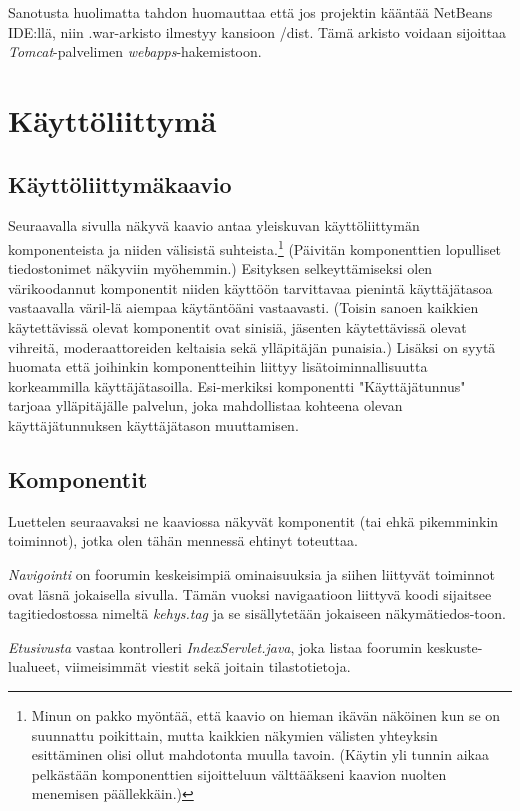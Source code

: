 \documentclass[11pt]{article}
\begin{document}
			Sanotusta huolimatta tahdon huomauttaa että jos projektin 
			kääntää NetBeans IDE:llä, niin .war-arkisto ilmestyy kansioon /dist. Tämä arkisto voidaan
			sijoittaa \emph{Tomcat}-palvelimen \emph{webapps}-hakemistoon.
	
\newpage
\thispagestyle{plain}
	\section{Käyttöliittymä}
		\subsection{Käyttöliittymäkaavio} Seuraavalla sivulla näkyvä kaavio antaa yleiskuvan käyttöliittymän
		komponenteista ja niiden välisistä suhteista.\footnote{Minun on pakko myöntää, että kaavio on hieman
		ikävän näköinen kun se on suunnattu poikittain, mutta kaikkien näkymien välisten yhteyksin esittäminen
		olisi ollut mahdotonta muulla tavoin. (Käytin yli tunnin aikaa pelkästään komponenttien sijoitteluun 
		välttääkseni kaavion nuolten menemisen päällekkäin.)} (Päivitän komponenttien lopulliset tiedostonimet
		näkyviin myöhemmin.) Esityksen selkeyttämiseksi olen värikoodannut komponentit niiden käyttöön
		tarvittavaa pienintä käyttäjätasoa vastaavalla väril-lä aiempaa käytäntöäni vastaavasti. (Toisin sanoen
		kaikkien käytettävissä olevat komponentit ovat sinisiä, jäsenten käytettävissä olevat vihreitä,
		moderaattoreiden keltaisia sekä ylläpitäjän punaisia.) Lisäksi on syytä huomata että joihinkin
		komponentteihin liittyy	lisätoiminnallisuutta korkeammilla käyttäjätasoilla. Esi-merkiksi komponentti
		"Käyttäjätunnus" tarjoaa ylläpitäjälle palvelun, joka mahdollistaa kohteena olevan käyttäjätunnuksen
		käyttäjätason muuttamisen.
		
		\subsection{Komponentit} Luettelen seuraavaksi ne kaaviossa näkyvät komponentit (tai ehkä pikemminkin
		toiminnot), jotka olen tähän mennessä ehtinyt toteuttaa.
		
		\emph{Navigointi} on foorumin keskeisimpiä ominaisuuksia ja siihen liittyvät toiminnot ovat läsnä
		jokaisella sivulla. Tämän vuoksi navigaatioon liittyvä koodi sijaitsee tagitiedostossa nimeltä
		\emph{kehys.tag} ja se sisällytetään jokaiseen näkymätiedos-toon.
		
		\emph{Etusivusta} vastaa kontrolleri \emph{IndexServlet.java}, joka listaa foorumin keskuste-lualueet,
		viimeisimmät viestit sekä joitain tilastotietoja.
		
\end{document}

